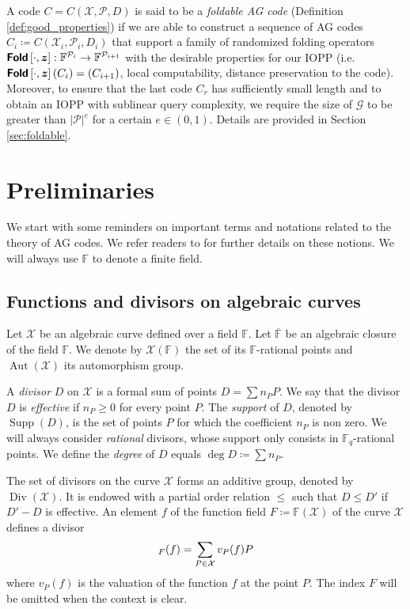 \documentclass[a4paper,USenglish,autoref]{lipics-v2021}
\newcommand\F{\mathbb{F}}
\newcommand\Fq{\mathbb{F}_q}
\newcommand\fold[1]{\textsf{\textbf{Fold}}\left[#1\right]}
\renewcommand{\bar}{\overline}
\DeclareMathOperator{\Supp}{Supp}
\DeclareMathOperator{\Aut}{Aut}
\DeclareMathOperator{\Div}{Div}
\let\div\relax\DeclareMathOperator{\div}{div}
\renewcommand{\vec}[1]{\boldsymbol{#1}}
\newcommand{\size}[1]{\left|#1\right|}
\newcommand\bfz{{\vec{z}}}
\newcommand\calX{\mathcal{X}}
\newcommand\calP{\mathcal{P}}
\newcommand\calG{\mathcal{G}}
\newcommand\mydef{\coloneqq}
\begin{document}
A code $C = C(\calX, \calP, D)$ is said to be a \emph{foldable AG code} (Definition \ref{def:good_properties}) if we are able to construct a sequence of AG codes $C_i\mydef C(\calX_i,\calP_i,D_i)$ that support a family of randomized folding operators $\fold{\cdot, \bfz} : \F^{\calP_i} \rightarrow \F^{\calP_{i+1}}$ with the desirable properties for our IOPP (i.e. $\fold{\cdot, \bfz}(C_i) = (C_{i+1})$, local computability, distance preservation to the code). Moreover, to ensure that the last code $C_r$ has sufficiently small length and to obtain an IOPP with sublinear query complexity, we require the size of $\calG$ to be greater than $\size{\calP}^{e}$ for a certain $e \in (0,1)$. Details are provided in Section \ref{sec:foldable}.

\section{Preliminaries}\label{sec:preli}

We start with some reminders on important terms and notations related to the theory of AG codes. We refer readers to \cite{TNV07,S08} for further details on these notions. We will always use $\F$ to denote a finite field.

\subsection{Functions and divisors on algebraic curves}
Let $\calX$ be an algebraic curve defined over a field $\F$. Let $\bar{\F}$ be an algebraic closure of the field $\F$. We denote by $\calX(\F)$ the set of its $\F$-rational points and $\Aut(\calX)$ its automorphism group. 


A \emph{divisor} $D$ on $\calX$ is a formal sum of points $D=\sum n_P P$. We say that the divisor $D$ is \emph{effective} if $n_P \geq 0$ for every point $P$. The \emph{support} of $D$, denoted by $\Supp(D)$, is the set of points $P$ for which the coefficient $n_P$ is non zero. We will always consider \textit{rational} divisors, whose support only consists in $\Fq$-rational points. We define the \emph{degree} of $D$ equals $\deg D \mydef \sum n_P$.

The set of divisors on the curve $\calX$ forms an additive group, denoted by $\Div(\calX)$. It is endowed with a partial order relation $\leq$ such that $D \leq D'$ if $D'-D$ is effective. An element $f$ of the function field $F\mydef \F(\calX)$ of the curve $\calX$ defines a divisor 
\[\div_{F}(f) = \sum_{P\in \calX} v_P(f) P\]
where $v_P(f)$ is the valuation of the function $f$ at the point $P$. The index $F$ will be omitted when the context is clear.
\end{document}
